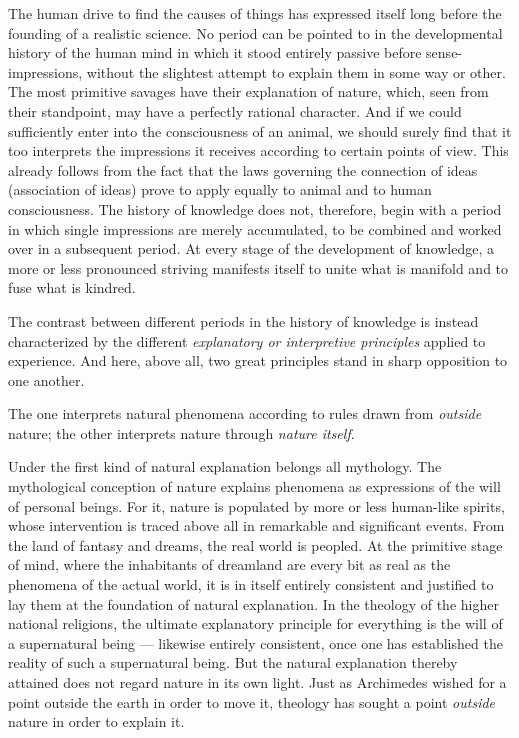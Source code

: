 \documentclass[12pt,a4paper,openany]{book}
\newcommand{\opage}[1]{\marginnote{\footnotesize\textit{[#1]}}}
\begin{document}
The human drive to find the causes of things has expressed itself long before the founding of a realistic science. No period can be pointed to in the developmental history of the human mind in which it stood entirely passive before sense-impressions, without the slightest attempt to explain them in some way or other. The most primitive savages have their explanation of nature, which, seen from their standpoint, may have a perfectly rational character. And if we could sufficiently enter into the consciousness of an animal, we should surely find that it too interprets the impressions it receives according to certain points of view. This already follows from the fact that the laws governing the connection of ideas (association of ideas) prove to apply equally to animal and to human consciousness. The history of knowledge does not, therefore, begin with a period in which single impressions are merely accumulated, to be combined and worked over in a subsequent period. At every stage of the development of knowledge, a more or less pronounced striving manifests itself to unite what is manifold and to fuse what is kindred.

The contrast between different periods in the history of knowledge is instead characterized by the different \emph{explanatory or interpretive principles} applied to experience. And here, above all, two great principles stand in sharp opposition to one another.

The one interprets natural phenomena according to rules drawn from \emph{outside} nature; the other interprets nature through \emph{nature itself}.

Under the first kind of natural explanation belongs all
\opage{3}mythology. The mythological conception of nature explains phenomena as expressions of the will of personal beings. For it, nature is populated by more or less human-like spirits, whose intervention is traced above all in remarkable and significant events. From the land of fantasy and dreams, the real world is peopled. At the primitive stage of mind, where the inhabitants of dreamland are every bit as real as the phenomena of the actual world, it is in itself entirely consistent and justified to lay them at the foundation of natural explanation. In the theology of the higher national religions, the ultimate explanatory principle for everything is the will of a supernatural being --- likewise entirely consistent, once one has established the reality of such a supernatural being. But the natural explanation thereby attained does not regard nature in its own light. Just as Archimedes wished for a point outside the earth in order to move it, theology has sought a point \emph{outside} nature in order to explain it.
\end{document}
